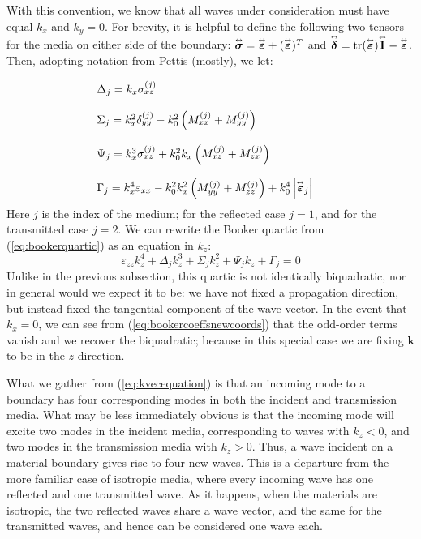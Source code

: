 \documentclass[11pt, reqno]{book}%
\newcounter{ct}
\newcommand{\es}{\begin{equation}}
\newcommand{\ef}{\end{equation} \vspace{0.05in}}
\newcommand{\mbf}{\mathbf}
\newcommand{\mbfg}[1]{\mbf{\mbox{\boldmath$#1$}}}
\newcommand{\mbfh}[1]{\hat{\mbf{#1}}}
\newcommand{\ve}{\varepsilon}
\newcommand{\tens}{\overset{\text{\tiny$\leftrightarrow$}}}
\begin{document}


With this convention, we know that all waves under consideration must have equal $k_x$ and $k_y=0$. For brevity, it is helpful to define the following two tensors for the media on either side of the boundary: $\tens{\mbfg{\sigma}}= \tens{\mbfg{\ve}}+(\tens{\mbfg{\ve}})^T$ and $\tens{\mbfg{\delta}}= \mbox{tr}(\tens{\mbfg{\ve}})\tens{\mbf{I}}-\tens{\mbfg{\ve}}$. Then, adopting notation from Pettis (mostly), we let:


\es
\begin{array}{l}
\Delta_j = k_x\sigma^{(j)}_{xz}\\
\\
\Sigma_j =k^2_x\delta^{(j)}_{yy}-k^2_0 \left(M^{(j)}_{xx}+M^{(j)}_{yy}\right) \\
\\
\Psi_j = k^3_x\sigma^{(j)}_{xz}+k^2_0 k_x\left(M^{(j)}_{xz}+M^{(j)}_{zx}\right)\\
\\
\begin{split}
\Gamma_j &= k^4_x \ve_{xx}-k^2_0 k^2_x\left(M^{(j)}_{yy}+M^{(j)}_{zz}\right) +k^4_0 \left|\tens{\mbfg{\ve}}_j  \right|
\end{split}
\end{array}
\label{eq:bookercoeffsnewcoords}
\ef
\noindent Here $j$ is the index of the medium; for the reflected case $j=1$, and for the transmitted case $j=2$. We can rewrite the Booker quartic from (\ref{eq:bookerquartic}) as an equation in $k_z$:
\es
\ve_{zz} k^4_z +\Delta_j k^3_z+\Sigma_j k^2_z +\Psi_j k_z +\Gamma_j =0
\label{eq:kvecequation}
\ef
\noindent Unlike in the previous subsection, this quartic is not identically biquadratic, nor in general would we expect it to be: we have not fixed a propagation direction, but instead fixed the tangential component of the wave vector. In the event that $k_x=0$, we can see from (\ref{eq:bookercoeffsnewcoords}) that the odd-order terms vanish and we recover the biquadratic; because in this special case we are fixing $\mbf{k}$ to be in the $z$-direction.

What we gather from (\ref{eq:kvecequation}) is that an incoming mode to a boundary has four corresponding modes in both the incident and transmission media. What may be less immediately obvious is that the incoming mode will excite two modes in the incident media, corresponding to waves with $k_z<0$, and two modes in the transmission media with $k_z>0$. Thus, a wave incident on a material boundary gives rise to four new waves. This is a departure from the more familiar case of isotropic media, where every incoming wave has one reflected and one transmitted wave. As it happens, when the materials are isotropic, the two reflected waves share a wave vector, and the same for the transmitted waves, and hence can be considered one wave each.
\end{document}
